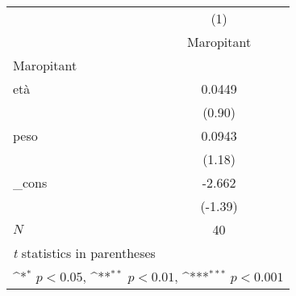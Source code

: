 {
\def\sym#1{\ifmmode^{#1}\else\(^{#1}\)\fi}
\begin{tabular}{l*{1}{c}}
\hline\hline
            &\multicolumn{1}{c}{(1)}\\
            &\multicolumn{1}{c}{Maropitant}\\
\hline
Maropitant  &                     \\
età         &      0.0449         \\
            &      (0.90)         \\
[1em]
peso        &      0.0943         \\
            &      (1.18)         \\
[1em]
\_cons      &      -2.662         \\
            &     (-1.39)         \\
\hline
\(N\)       &          40         \\
\hline\hline
\multicolumn{2}{l}{\footnotesize \textit{t} statistics in parentheses}\\
\multicolumn{2}{l}{\footnotesize \sym{*} \(p<0.05\), \sym{**} \(p<0.01\), \sym{***} \(p<0.001\)}\\
\end{tabular}
}
